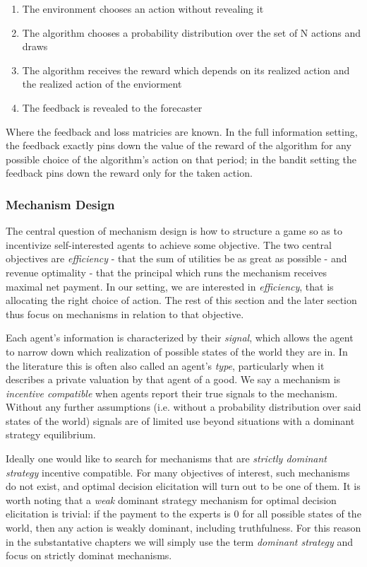\begin{enumerate}
\item The environment chooses an action without revealing it
\item The algorithm chooses a probability distribution over the set of N actions and draws
\item The algorithm receives the reward which depends on its realized action and the realized action of the enviorment
\item The feedback is revealed to the forecaster
\end{enumerate}

Where the feedback and loss matricies are known. In the full information setting, the feedback exactly pins down the value of the reward of the algorithm for any possible choice of the algorithm's action on that period; in the bandit setting the feedback pins down the reward only for the taken action.


\subsubsection{Mechanism Design}

The central question of mechanism design is how to structure a game so as to incentivize self-interested agents to achieve some objective.
The two central objectives are \emph{efficiency} - that the sum of utilities be as great as possible - and revenue optimality - that the principal which runs the mechanism receives maximal net payment.
In our setting, we are interested in \emph{efficiency}, that is allocating the right choice of action. The rest of this section and the later section thus focus on mechanisms in relation to that objective.

Each agent's information is characterized by their \emph{signal}, which allows the agent to narrow down which realization of possible states of the world they are in. In the literature this is often also called an agent's \emph{type}, particularly when it describes a private valuation by that agent of a good.
We say a mechanism is \emph{incentive compatible} when agents report their true signals to the mechanism. 
Without any further assumptions (i.e. without a probability distribution over said states of the world) signals are of limited use beyond situations with a dominant strategy equilibrium.

Ideally one would like to search for mechanisms that are \emph{strictly dominant strategy} incentive compatible.
For many objectives of interest, such mechanisms do not exist, and optimal decision elicitation will turn out to be one of them. 
It is worth noting that a \emph{weak} dominant strategy mechanism for optimal decision elicitation is trivial: if the payment to the experts is 0 for all possible states of the world, then any action is weakly dominant, including truthfulness. 
For this reason in the substantative chapters we will simply use the term \emph{dominant strategy} and focus on strictly dominat mechanisms. 

